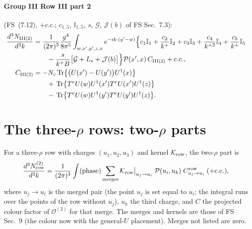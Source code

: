 \documentclass[10pt]{article}
\numberwithin{equation}{section}
\newcommand{\Ls}{L_{*}}
\newcommand{\OO}{\mathcal O}
\newcommand{\KK}{\mathcal K}
\newcommand{\PP}{\mathcal P}
\newcommand{\pre}{\frac{1}{(2\pi)^3}}
\begin{document}
\paragraph{Group III Row III part 2} (FS~(7.12), $+$c.c.; $c_{1..5}$, $\mathbb I_{1..5}$, $s$, $\mathcal G$, $\mathcal J(b)$ of FS Sec.~7.3):
\begin{align}
\frac{d^3N_{\rm III(2)}}{d^3k}&=\pre\frac{g^4}{8\pi^5}\int_{w,x',y',z,x}e^{-ik\cdot(y'-w)}\Big\{c_1\mathbb I_1+\frac{c_2}{k^+}\mathbb I_2+c_3\mathbb I_3+\frac{c_4}{k^{+2}}\mathbb I_4+\frac{c_5}{k^+}\mathbb I_5\notag\\
&\qquad-\frac{s}{k^+B}\big[\mathcal G+\Ls+\mathcal J(b)\big]\Big\}\PP(x',x)\,C_{\rm III(2)}+{\rm c.c.},\label{eq:sIII2}\\
C_{\rm III(2)}&=-N_c\,{\rm Tr}\big\{\big(U(x')-U(y')\big)U^\dagger(x)\big\}\notag\\
&\qquad+\,{\rm Tr}\big\{T^eU(w)U^\dagger(x')T^eU(x')U^\dagger(z)\big\}\notag\\
&\qquad-\,{\rm Tr}\big\{T^eU(w)U^\dagger(y')T^eU(y')U^\dagger(z)\big\}.\notag
\end{align}

\section{The three-\texorpdfstring{$\rho$}{rho} rows: two-\texorpdfstring{$\rho$}{rho} parts}\label{sec:three}
For a three-$\rho$ row with charges $(u_1,u_2,u_3)$ and kernel $\KK_{\rm row}$, the two-$\rho$ part is
\begin{equation}
\frac{d^3N^{(2)}_{\rm row}}{d^3k}=\pre\int(\text{phase})\sum_{\rm merges}\KK_{\rm row}\big|_{u_j\to u_i}\;\PP(u_i,u_k)\;C^{\rm row}_{u_j\to u_i}\;(+{\rm c.c.}),
\label{eq:three}
\end{equation}
where $u_j\to u_i$ is the merged pair (the point $u_j$ is set equal to $u_i$; the integral runs over the points of the row without $u_j$), $u_k$ the third charge, and $C$ the projected colour factor of $\OO^{(2)}$ for that merge. The merges and kernels are those of FS Sec.~9 (the colour now with the general-$U$ placement). Merges not listed are zero.
\end{document}
